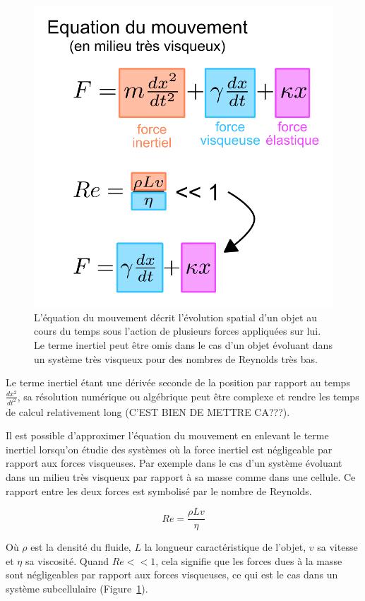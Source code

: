 \documentclass[12pt,a4paper,twoside,openright]{book}
\begin{document}
\begin{figure}[htbp]
\centering
\includegraphics{figures/results/modelling/motion_equation.png}
\caption[L'équation du mouvement]{\label{fig:motion_equation}L'équation
du mouvement décrit l'évolution spatial d'un objet au cours du temps
sous l'action de plusieurs forces appliquées sur lui. Le terme inertiel
peut être omis dans le cas d'un objet évoluant dans un système très
visqueux pour des nombres de Reynolds très bas.}
\end{figure}

Le terme inertiel étant une dérivée seconde de la position par rapport
au temps \(\frac{dx^2}{dt^2}\), sa résolution numérique ou algébrique
peut être complexe et rendre les temps de calcul relativement long
(C'EST BIEN DE METTRE CA???).

Il est possible d'approximer l'équation du mouvement en enlevant le
terme inertiel lorsqu'on étudie des systèmes où la force inertiel est
négligeable par rapport aux forces visqueuses. Par exemple dans le cas
d'un système évoluant dans un milieu très visqueux par rapport à sa
masse comme dans une cellule. Ce rapport entre les deux forces est
symbolisé par le nombre de Reynolds.

\[
Re = \frac{\rho Lv}{\eta}
\]

Où \(\rho\) est la densité du fluide, \(L\) la longueur caractéristique
de l'objet, \(v\) sa vitesse et \(\eta\) sa viscosité. Quand
\(Re << 1\), cela signifie que les forces dues à la masse sont
négligeables par rapport aux forces visqueuses, ce qui est le cas dans
un système subcellulaire (Figure~\ref{fig:motion_equation}).
\end{document}
